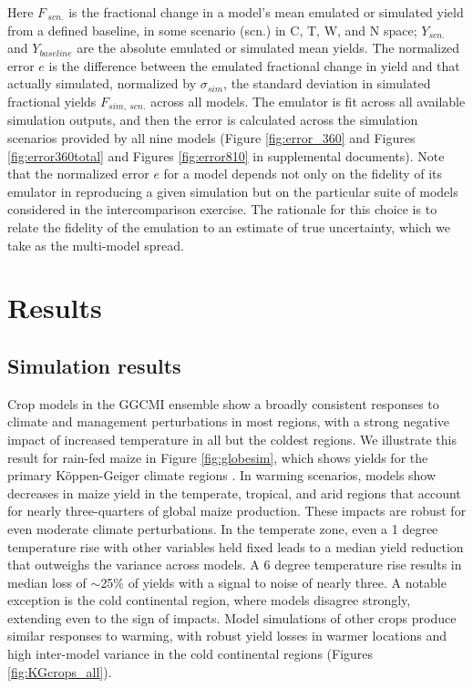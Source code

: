 \documentclass[preprint, 5p, times, twocolumn]{elsarticle}
\begin{document}
{Here $F_{\: scn.}$ is the fractional change in a model's mean emulated or simulated yield from a defined baseline, in some scenario (scn.) in C, T, W, and N space; $Y_{scn.}$ and $Y_{baseline}$ are the absolute emulated or simulated mean yields. The normalized error $e$ is the difference between the emulated fractional change in yield and that actually simulated, normalized by $\sigma_{sim}$, the standard deviation in simulated fractional yields $F_{sim,\: scn.}$ across all models. The emulator is fit across all available simulation outputs, and then the error is calculated across the simulation scenarios provided by all nine models (Figure \ref{fig:error_360} and Figures \ref{fig:error360total} and Figures \ref{fig:error810} in supplemental documents). Note that the normalized error $e$ for a model depends not only on the fidelity of its emulator in reproducing a given simulation but on the particular suite of models considered in the intercomparison exercise. The rationale for this choice is to relate the fidelity of the emulation to an estimate of true uncertainty, which we take as the multi-model spread. 

\section{Results}
\label{S:3}
\subsection{Simulation results}
Crop models in the GGCMI ensemble show a broadly consistent responses to climate and management perturbations in most regions, with a strong negative impact of increased temperature in all but the coldest regions. We illustrate this result for rain-fed maize in Figure \ref{fig:globesim}, which shows yields for the primary K\"{o}ppen-Geiger climate regions \citep{rubel2010}. In warming scenarios, models show decreases in maize yield in the temperate, tropical, and arid regions that account for nearly three-quarters of global maize production. These impacts are robust for even moderate climate perturbations. In the temperate zone, even a 1 degree temperature rise with other variables held fixed leads to a median yield reduction that outweighs the variance across models. A 6 degree temperature rise results in median loss of $\sim$25\% of yields with a signal to noise of nearly three. A notable exception is the cold continental region, where models disagree strongly, extending even to the sign of impacts. Model simulations of other crops produce similar responses to warming, with robust yield losses in warmer locations and high inter-model variance in the cold continental regions (Figures \ref{fig:KGcrops_all}).

}
\end{document}
